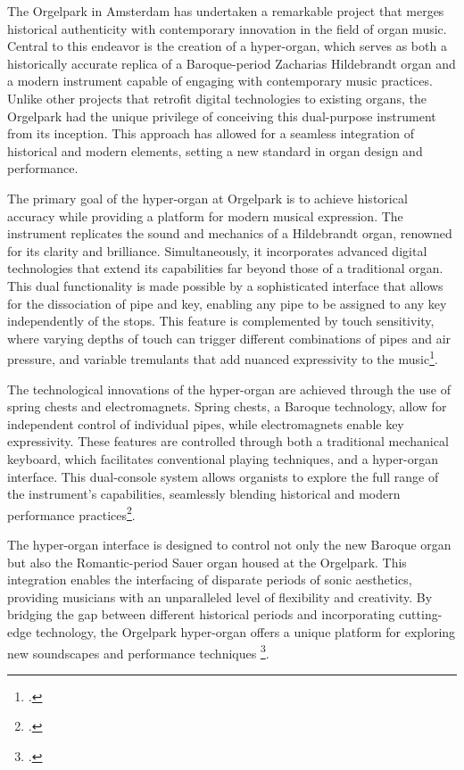 \documentclass[12pt,twoside,maitrise]{dms_ks}
\theoremstyle{definition}
\begin{document}
{The Orgelpark in Amsterdam has undertaken a remarkable project that merges historical authenticity with contemporary innovation in the field of organ music. 
Central to this endeavor is the creation of a hyper-organ, which serves as both a historically accurate replica of a Baroque-period Zacharias Hildebrandt organ and a modern instrument capable of engaging with contemporary music practices. 
Unlike other projects that retrofit digital technologies to existing organs, the Orgelpark had the unique privilege of conceiving this dual-purpose instrument from its inception. 
This approach has allowed for a seamless integration of historical and modern elements, setting a new standard in organ design and performance.

The primary goal of the hyper-organ at Orgelpark is to achieve historical accuracy while providing a platform for modern musical expression. 
The instrument replicates the sound and mechanics of a Hildebrandt organ, renowned for its clarity and brilliance. 
Simultaneously, it incorporates advanced digital technologies that extend its capabilities far beyond those of a traditional organ. 
This dual functionality is made possible by a sophisticated interface that allows for the dissociation of pipe and key, enabling any pipe to be assigned to any key independently of the stops. 
This feature is complemented by touch sensitivity, where varying depths of touch can trigger different combinations of pipes and air pressure, and variable tremulants that add nuanced expressivity to the music\footcite{fidom_digital_2014}.

The technological innovations of the hyper-organ are achieved through the use of spring chests and electromagnets. 
Spring chests, a Baroque technology, allow for independent control of individual pipes, while electromagnets enable key expressivity. 
These features are controlled through both a traditional mechanical keyboard, which facilitates conventional playing techniques, and a hyper-organ interface. 
This dual-console system allows organists to explore the full range of the instrument's capabilities, seamlessly blending historical and modern performance practices\footcite{peters_how_2014}.

The hyper-organ interface is designed to control not only the new Baroque organ but also the Romantic-period Sauer organ housed at the Orgelpark. 
This integration enables the interfacing of disparate periods of sonic aesthetics, providing musicians with an unparalleled level of flexibility and creativity. By bridging the gap between different historical periods and incorporating cutting-edge technology, the Orgelpark hyper-organ offers a unique platform for exploring new soundscapes and performance techniques \footcite{van_heumen_new_2014}.

}
\end{document}
